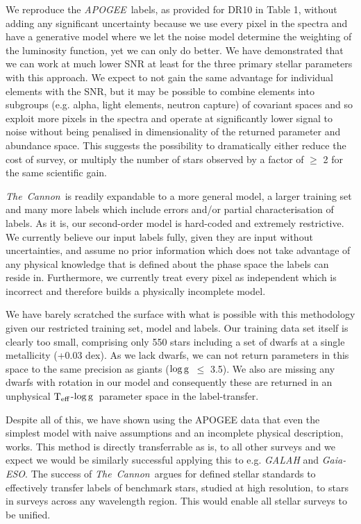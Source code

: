 \documentclass[12pt, preprint]{aastex}
\newcommand{\teff}{\mbox{$\rm T_{eff}$}}
\newcommand{\logg}{\mbox{$\rm \log g$}}
\newcommand{\tc}{\textsl{The~Cannon}}
\newcommand{\apogee}{\textsl{APOGEE}}
\newcommand{\gaiaeso}{\textsl{Gaia-ESO}}
\begin{document}
We reproduce the \apogee\ labels, as provided for DR10 in Table 1, without adding any significant uncertainty because we use every pixel in the spectra and have a generative model where we let the noise model determine the weighting of the luminosity function, yet we can only do better. We have demonstrated that we can work at much lower SNR at least for the three primary stellar parameters with this approach. We expect to not gain the same advantage for individual elements with the SNR, but it may be possible to combine elements into subgroups (e.g. alpha, light elements, neutron capture) of covariant spaces \citep[e.g.][]{Ting2012} and so exploit more pixels in the spectra and operate at significantly lower signal to noise without being penalised in dimensionality of the returned parameter and abundance space. This suggests the possibility to dramatically either reduce the cost of survey, or multiply the number of stars observed by a factor of $\ge$ 2 for the same scientific gain. 
 
 \tc\ is readily expandable to a more general model, a larger training set and many more labels which include errors and/or partial characterisation of labels. As it is, our second-order model is hard-coded and extremely restrictive. We currently believe our input labels fully, given they are input without uncertainties, and assume no prior information which does not take advantage of any physical knowledge that is defined about the phase space the labels can reside in.  Furthermore, we currently treat every pixel as independent which is incorrect and therefore builds a physically incomplete model.

 We have barely scratched the surface with what is possible with this methodology given our restricted training set, model and labels. Our training data set itself is clearly too small, comprising only 550 stars including a set of dwarfs at a single metallicity (+0.03 dex). As we lack dwarfs, we can not return parameters in this space to the same precision as giants (\logg\ $\le$ 3.5).  We also are missing any dwarfs with rotation in our model and consequently these are returned in an unphysical \teff-\logg\ parameter space in the label-transfer. 
 
Despite all of this, we have shown using the APOGEE data that even the simplest model with naive assumptions and an incomplete physical description, works. This method is directly transferrable as is, to all other surveys and we expect we would be similarly successful applying this to e.g. \textit{GALAH} and \gaiaeso. The success of \tc\ argues for defined stellar standards to effectively transfer labels of benchmark stars, studied at high resolution, to stars in surveys across any wavelength region. This would enable all stellar surveys to be unified. 
 
\end{document}
